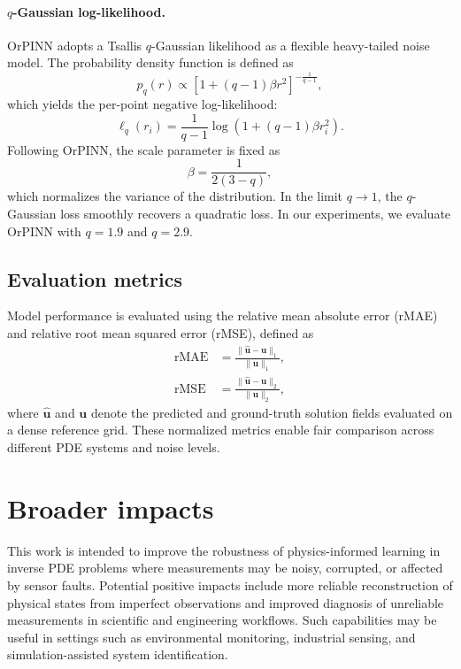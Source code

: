 \documentclass{article}
\theoremstyle{plain}
\theoremstyle{definition}
\theoremstyle{remark}
\begin{document}
\paragraph{$q$-Gaussian log-likelihood.} OrPINN adopts a Tsallis $q$-Gaussian likelihood as a flexible heavy-tailed noise model. The probability density function is defined as
\begin{equation}
    p_q(r) \propto [1+(q-1) \beta r^2]^{-\frac{1}{q-1}},
\end{equation}
which yields the per-point negative log-likelihood:
\begin{equation}
    \ell_q(r_i) = \frac{1}{q-1} \log (1+(q-1) \beta r_i^2).
\end{equation}
Following OrPINN, the scale parameter is fixed as
\begin{equation}
    \beta = \frac{1}{2(3-q)},
\end{equation}
which normalizes the variance of the distribution. In the limit $q \rightarrow 1$, the $q$-Gaussian loss smoothly recovers a quadratic loss. In our experiments, we evaluate OrPINN with $q=1.9$ and $q=2.9$.

\subsection{Evaluation metrics}
Model performance is evaluated using the relative mean absolute error (rMAE) and relative root mean squared error (rMSE), defined as
\begin{align}
\mathrm{rMAE} &= \frac{\|\hat{\mathbf{u}} - \mathbf{u}\|_1}{\|\mathbf{u}\|_1}, \\
\mathrm{rMSE} &= \frac{\|\hat{\mathbf{u}} - \mathbf{u}\|_2}{\|\mathbf{u}\|_2},
\end{align}
where $\hat{\mathbf{u}}$ and $\mathbf{u}$ denote the predicted and ground-truth solution fields evaluated on a dense reference grid. These normalized metrics enable fair comparison across different PDE systems and noise levels.

\section{Broader impacts}

This work is intended to improve the robustness of physics-informed learning in inverse PDE problems where measurements may be noisy, corrupted, or affected by sensor faults.
Potential positive impacts include more reliable reconstruction of physical states from imperfect observations and improved diagnosis of unreliable measurements in scientific and engineering workflows.
Such capabilities may be useful in settings such as environmental monitoring, industrial sensing, and simulation-assisted system identification.
\end{document}
